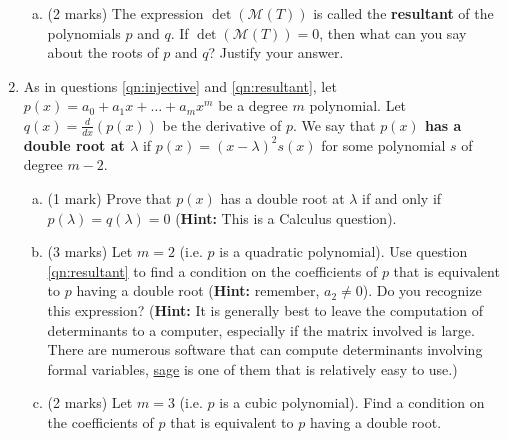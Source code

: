 \documentclass[12pt]{article}
\begin{document}
\begin{enumerate}
\begin{enumerate}[(a)]
  \item (2 marks) The expression $\det(\mathcal{M}(T))$ is called the \textbf{resultant} of the polynomials $p$ and $q$. If $\det(\mathcal{M}(T))=0$, then what can you say about the roots of $p$ and $q$? Justify your answer.
  \end{enumerate}
  \newpage
\item As in questions \ref{qn:injective} and \ref{qn:resultant}, let $p(x)=a_0+a_1x+\ldots +a_mx^m$ be a degree $m$ polynomial. Let $q(x)=\frac{d}{dx}(p(x))$ be the derivative of $p$. We say that \textbf{$p(x)$ has a double root at $\lambda$} if $p(x)=(x-\lambda)^2s(x)$ for some polynomial $s$ of degree $m-2$.
  \begin{enumerate}[(a)]
  \item (1 mark) Prove that $p(x)$ has a double root at $\lambda$ if and only if $p(\lambda)=q(\lambda)=0$ (\textbf{Hint:} This is a Calculus question).
  \item (3 marks) Let $m=2$ (i.e. $p$ is a quadratic polynomial). Use question \ref{qn:resultant} to find a condition on the coefficients of $p$ that is equivalent to $p$ having a double root (\textbf{Hint:} remember, $a_2\neq 0$). Do you recognize this expression? (\textbf{Hint:} It is generally best to leave the computation of determinants to a computer, especially if the matrix involved is large. There are numerous software that can compute determinants involving formal variables, \href{https://sagecell.sagemath.org/?z=eJyFVMFuozAQvSPxDyOhKlCcKFR7isQnVNr2irKRSUxiBY-JbRry9zs20LLqrjaHaGy9NzPvzZjkJBqJAtxFwEmcjRCW-SDtslKN0S0rkQG3IDHAbr2wTmqMI1W-xBH6vzhKpkQf3Ehet8JCo03AH7VoGnmUAp0FjqdwKfEknDBKInfCxlErrdMNt2VFCdIVPzzJFTzJLGSRvnS13WzUfj9D6xla_x2KHhoAw4qtHqssNKn4VQCHTrcP1EryFozEM9ylu_i27LL_NIAtPwvoqVtj3dg8d3AXcOfowGk6S7yCbhY5LdV6L39-nt-pRPr2xlSO-Q82K81nHXk1sMc-W5rIoenx6E0e6xntvE3BObLRSIqpJAefI46INUHSll2zXRwB_YxwvcG0rdbX3T5vq936OlWxnTjK5vF9OpTT3y2ksHHq0oIYuOpawQDiqAssW85aICFHuBHQCue8oV06ZCU_bHN-KJ6HfLPZUKSeh18qjm5_kGsie19vnlETo_5k1AckBoaWk7p38NA9HDkC9aVhIUL5QdTetpNsGmFIy0IDI5euIohgYUcmJTtIjVD6Y1z-ZE0ba7QKh1qcJaIXMjmCYqBp3zWlQj8Hmrt5kJnJ7ERVsBdW7CG5UPlRfpG_DPnwi15HMkuu1gXbfsGC5nUxgr6mP46l7RXSw6CAl1OVvNoulrygJV8Xe0rWSFrOiTJ3rDityRD4dXn7B1_9jz-u31Gj4xIt1Ae5tl8P6QvHoLfeLn8zbuLnBsfRa-kMR9tpK9IRnlbTunp17NvT9V3lC0j9DRIaz2gA9qLv6SsFHT1kl67oq0LHcsXGIPsN3bWYvg==&lang=sage&interacts=eJyLjgUAARUAuQ==}{sage} is one of them that is relatively easy to use.) 
  \item (2 marks) Let $m=3$ (i.e. $p$ is a cubic polynomial). Find a condition on the coefficients of $p$ that is equivalent to $p$ having a double root.

\end{enumerate}
\end{enumerate}
\end{document}
